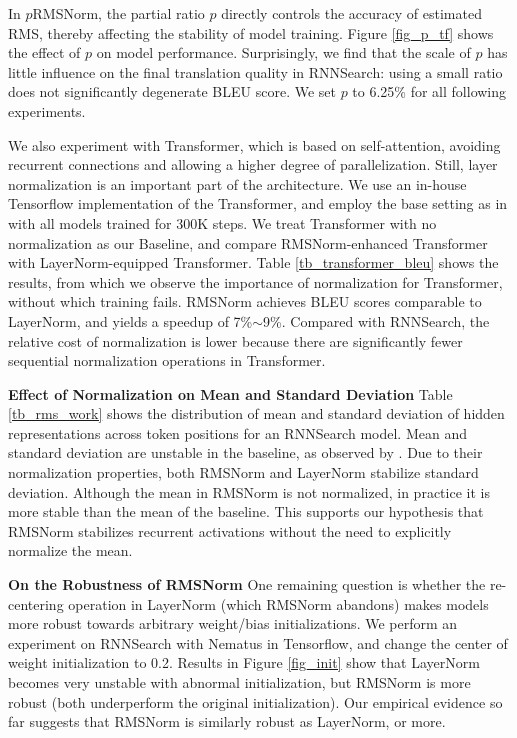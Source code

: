 In $p$RMSNorm, the partial ratio $p$ directly controls the accuracy of estimated RMS, thereby affecting the stability of model training. Figure \ref{fig_p_tf} shows the effect of $p$ on model performance. Surprisingly, we find that the scale of $p$ has little influence on the final translation quality in RNNSearch: using a small ratio does not significantly degenerate BLEU score. We set $p$ to 6.25\% for all following experiments. 

We also experiment with Transformer, which is based on self-attention, avoiding recurrent connections and allowing a higher degree of parallelization. Still, layer normalization is an important part of the architecture. We use an in-house Tensorflow implementation of the Transformer, and employ the base setting as in \cite{NIPS2017_7181} with all models trained for 300K steps. We treat Transformer with no normalization as our Baseline, and compare RMSNorm-enhanced Transformer with LayerNorm-equipped Transformer. Table \ref{tb_transformer_bleu} shows the results, from which we observe the importance of normalization for Transformer, without which training fails. RMSNorm achieves BLEU scores comparable to LayerNorm, and yields a speedup of 7\%$\sim$9\%. Compared with RNNSearch, the relative cost of normalization is lower because there are significantly fewer sequential normalization operations in Transformer.

 \textbf{Effect of Normalization on Mean and Standard Deviation} Table \ref{tb_rms_work} shows the distribution of mean and standard deviation of hidden representations across token positions for an RNNSearch model. Mean and standard deviation are unstable in the baseline, as observed by \citet{ba2016layer}.
Due to their normalization properties, both RMSNorm and LayerNorm stabilize standard deviation. Although the mean in RMSNorm is not normalized, in practice it is more stable than the mean of the baseline. This supports our hypothesis that RMSNorm stabilizes recurrent activations without the need to explicitly normalize the mean.

 \textbf{On the Robustness of RMSNorm} One remaining question is whether the re-centering operation in LayerNorm (which RMSNorm abandons) makes models more robust towards arbitrary weight/bias initializations. We perform an experiment on RNNSearch with Nematus in Tensorflow, and change the center of weight initialization to 0.2. Results in Figure \ref{fig_init} show that LayerNorm becomes very unstable with abnormal initialization, but RMSNorm is more robust (both underperform the original initialization). Our empirical evidence so far suggests that RMSNorm is similarly robust as LayerNorm, or more.

